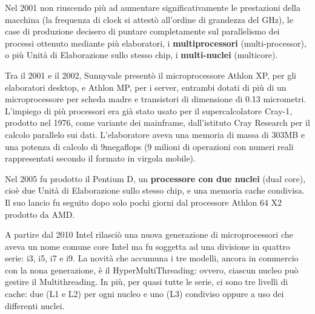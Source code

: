 \documentclass[12pt]{article}
\begin{document}
Nel 2001 non riuscendo più ad aumentare significativamente le prestazioni della macchina (la frequenza di clock si attestò all’ordine di grandezza del GHz), le case di produzione decisero di puntare completamente sul parallelismo dei processi ottenuto mediante più elaboratori, i \textbf{multiprocessori} (multi-processor), o più Unità di Elaborazione sullo stesso chip, i\textbf{ multi-nuclei }(multicore).\par\medskip\noindent
Tra il 2001 e il 2002, Sunnyvale presentò il microprocessore Athlon XP, per gli elaboratori desktop, e Athlon MP, per i server, entrambi dotati di più di un microprocessore per scheda madre e transistori di dimensione di 0.13 micrometri. L’impiego di più processori era già stato usato per il supercalcolatore Cray-1, prodotto nel 1976, come variante dei mainframe, dall’istituto Cray Research per il calcolo parallelo sui dati. L’elaboratore aveva una memoria di massa di 303MB e una potenza di calcolo di 9megaflops (9 milioni di operazioni con numeri reali rappresentati secondo il formato in virgola mobile).\par\medskip\noindent
Nel 2005 fu prodotto il Pentium D, un \textbf{processore con due nuclei} (dual core), cioè due Unità di Elaborazione sullo stesso chip, e una memoria cache condivisa. Il suo lancio fu seguito dopo solo pochi giorni dal processore Athlon 64 X2 prodotto da AMD.\par\medskip\noindent
A partire dal 2010 Intel rilasciò una nuova generazione di microprocessori che aveva un nome comune core Intel ma fu soggetta ad una divisione in quattro serie: i3, i5, i7 e i9. La novità che accumuna i tre modelli, ancora in commercio con la nona generazione, è il HyperMultiThreading: ovvero, ciascun nucleo può gestire il Multithreading. In più, per quasi tutte le serie, ci sono tre livelli di cache: due (L1 e L2) per ogni nucleo e uno (L3) condiviso oppure a uso dei differenti nuclei. 
\par\medskip\noindent
\end{document}
